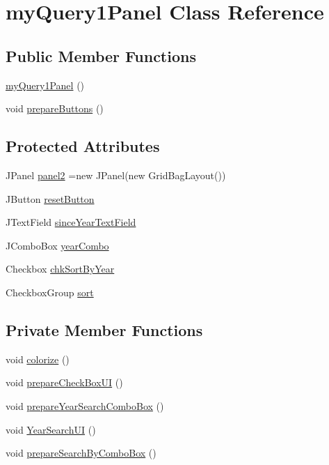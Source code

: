 \hypertarget{classmy_query1_panel}{}\section{my\+Query1\+Panel Class Reference}
\label{classmy_query1_panel}
\subsection*{Public Member Functions}
\begin{DoxyCompactItemize}
\item 
\hyperlink{classmy_query1_panel_add6c4e09fbce53ae0b2eb34e2da0c55e}{my\+Query1\+Panel} ()
\item 
void \hyperlink{classmy_query1_panel_a0a640aa15c5356a9eab718201267a245}{prepare\+Buttons} ()
\end{DoxyCompactItemize}
\subsection*{Protected Attributes}
\begin{DoxyCompactItemize}
\item 
J\+Panel \hyperlink{classmy_query1_panel_aba2fe28e793bc84fe789e98c7b89e065}{panel2} =new J\+Panel(new Grid\+Bag\+Layout())
\item 
J\+Button \hyperlink{classmy_query1_panel_a0e0a620150837e7d0caa3386fdd1879b}{reset\+Button}
\item 
J\+Text\+Field \hyperlink{classmy_query1_panel_a60b95255f8c6ffeb063ca97c79206c49}{since\+Year\+Text\+Field}
\item 
J\+Combo\+Box \hyperlink{classmy_query1_panel_ac662f986c33598e85559ac3d93f634b0}{year\+Combo}
\item 
Checkbox \hyperlink{classmy_query1_panel_a112a1c15d47ccd9a16a3d5d4e7211809}{chk\+Sort\+By\+Year}
\item 
Checkbox\+Group \hyperlink{classmy_query1_panel_a5ae5e5e6cfc109b6a15ac6811604a5c1}{sort}
\end{DoxyCompactItemize}
\subsection*{Private Member Functions}
\begin{DoxyCompactItemize}
\item 
void \hyperlink{classmy_query1_panel_ab03012b238b9d2e22928784002a28e7f}{colorize} ()
\item 
void \hyperlink{classmy_query1_panel_ad7b5f2e116e6e88a6d8c71f2c0633b42}{prepare\+Check\+Box\+UI} ()
\item 
void \hyperlink{classmy_query1_panel_a31942385ff8324fbe1220229037b2cf6}{prepare\+Year\+Search\+Combo\+Box} ()
\item 
void \hyperlink{classmy_query1_panel_a1d028e5e8a80ea2a14956e7facfe3ce3}{Year\+Search\+UI} ()
\item 
void \hyperlink{classmy_query1_panel_ab15b9ca3d19fe07f6c660231ba97cd47}{prepare\+Search\+By\+Combo\+Box} ()
\end{DoxyCompactItemize}
